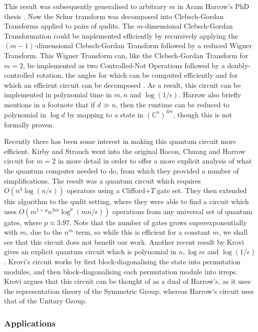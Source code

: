 This result was subsequently generalised to arbitrary $m$ in Aram Harrow's PhD thesis \cite{harrow2005, bacon2007}. Now the Schur transform was decomposed into Clebsch-Gordan Transforms applied to pairs of qudits. The $m$-dimensional Clebsch-Gordan Transformation could be implemented efficiently by recursively applying the $(m-1)$-dimensional Clebsch-Gordan Transform followed by a reduced Wigner Transform. This Wigner Transform can, like the Clebsch-Gordan Transform for $m=2$, be implemented as two Controlled-Not Operations followed by a doubly-controlled rotation, the angles for which can be computed efficiently and for which an efficient circuit can be decomposed \cite{nielsen2010}. As a result, this circuit can be implemented in polynomial time in $m, n$ and $\log(1/\epsilon)$. Harrow also briefly mentions in a footnote that if $d \gg n$, then the runtime can be reduced to polynomial in $\log d$ by mapping to a state in $(\mathbb{C}^n)^{\otimes n}$, though this is not formally proven.

Recently there has been some interest in making this quantum circuit more efficient. Kirby and Strauch \cite{kirby2018} went into the original Bacon, Chuang and Harrow circuit for $m=2$ in more detail in order to offer a more explicit  analysis of what the quantum computer needed to do, from which they provided a number of simplifications. The result was a quantum circuit which requires $O(n^4\log(n/\epsilon))$ operators using a Clifford+$T$ gate set. They then extended this algorithm to the qudit setting, where they were able to find a circuit which uses $O(m^{1+p}n^{3m}\log^p(mn/\epsilon))$ operations from any universal set of quantum gates, where $p\approx 3.97$. Note that the number of gates grows superexponentially with $m$, due to the $n^m$ term, so while this is efficient for a constant $m$, we shall see that this circuit does not benefit our work. Another recent result by Krovi \cite{Krovi2019} gives an explicit quantum circuit which is polynomial in $n, \log m$ and $\log(1/\epsilon)$. Krovi's circuit works by first block-diagonalising the state into permutation modules, and then block-diagonalising each permutation module into irreps. Krovi argues that this circuit can be thought of as a dual  of Harrow's, as it uses the representation theory of the Symmetric Group, whereas Harrow's circuit uses that of the Unitary Group.

\subsubsection{Applications}

